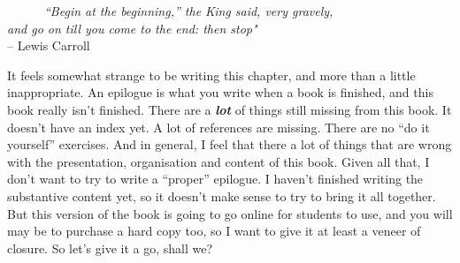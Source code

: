\documentclass[
]{book}
\begin{document}
~~~~~~\emph{``Begin at the beginning,'' the King said, very gravely,}\\
\hspace*{0.333em}\hspace*{0.333em}\hspace*{0.333em}\hspace*{0.333em}\hspace*{0.333em}\hspace*{0.333em}\emph{and go on till you come to the end: then stop"}\\
\hspace*{0.333em}\hspace*{0.333em}\hspace*{0.333em}\hspace*{0.333em}\hspace*{0.333em}\hspace*{0.333em}\hspace*{0.333em}\hspace*{0.333em}\hspace*{0.333em}\hspace*{0.333em}\hspace*{0.333em}\hspace*{0.333em}\hspace*{0.333em}\hspace*{0.333em}\hspace*{0.333em}\hspace*{0.333em}\hspace*{0.333em}\hspace*{0.333em}\hspace*{0.333em}\hspace*{0.333em}\hspace*{0.333em}\hspace*{0.333em}\hspace*{0.333em}\hspace*{0.333em}\hspace*{0.333em}\hspace*{0.333em}\hspace*{0.333em}\hspace*{0.333em}\hspace*{0.333em}\hspace*{0.333em}-- Lewis Carroll

\hfill\break
It feels somewhat strange to be writing this chapter, and more than a little inappropriate. An epilogue is what you write when a book is finished, and this book really isn't finished. There are a \textbf{\emph{lot}} of things still missing from this book. It doesn't have an index yet. A lot of references are missing. There are no ``do it yourself'' exercises. And in general, I feel that there a lot of things that are wrong with the presentation, organisation and content of this book. Given all that, I don't want to try to write a ``proper'' epilogue. I haven't finished writing the substantive content yet, so it doesn't make sense to try to bring it all together. But this version of the book is going to go online for students to use, and you will may be to purchase a hard copy too, so I want to give it at least a veneer of closure. So let's give it a go, shall we?
\end{document}
